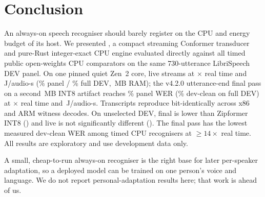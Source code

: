 \section{Conclusion}\label{sec:conclusion}

An always-on speech recogniser should barely register on the CPU and energy budget of its host. We
presented \ultra{}, a compact streaming Conformer transducer and pure-Rust integer-exact CPU engine
evaluated directly against all \ColdComparatorCount{} timed public open-weights CPU
comparators on the same 730-utterance LibriSpeech DEV panel. On one pinned quiet Zen~2 core, \ultra{} live
streams at \ColdLiveSpeed$\times$ real time and \ColdLiveWatts\,J/audio-s (\ColdLiveWer\% panel / \LookLiveFullWer\% full DEV,
\ColdLiveRss\,MB RAM); the v4.2.0 utterance-end final pass on a second \ColdHeadModel\,MB INT8 artifact reaches
\ColdHeadWer\% panel WER (\FinFullClean\% dev-clean on full DEV) at \ColdHeadSpeed$\times$ real time and \ColdHeadWatts\,J/audio-s. Transcripts reproduce bit-identically across \CandIsaRuns{} x86 and ARM
witness decodes. On unselected DEV, \ultra{} final is lower than Zipformer INT8 (\FinCZipDelta\pp) and live is not significantly
different (\LookLiveCZipDelta\pp). The final pass has the lowest measured dev-clean WER among timed CPU recognisers at $\geq 14\times$ real time.
All results are exploratory and use development data only.

 A small, cheap-to-run always-on recogniser is the right base for later
per-speaker adaptation, so a deployed model can be trained on one person's voice and language. We do
not report personal-adaptation results here; that work is ahead of us.
